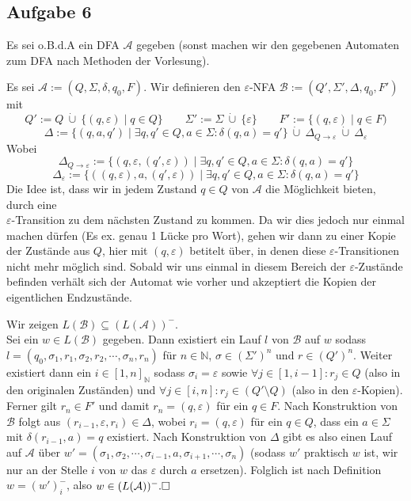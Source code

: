 \documentclass[a4paper,graphics,11pt]{article}
\newcommand{\aufgabe}[1]{\subsection*{Aufgabe #1}}
\begin{document}
\newpage
\aufgabe{6}
Es sei o.B.d.A ein DFA $\mathcal{A}$ gegeben (sonst machen wir den gegebenen Automaten zum DFA nach Methoden
der Vorlesung).

Es sei $\mathcal{A} := (Q, \Sigma, \delta, q_0, F)$.
Wir definieren den $\varepsilon$-NFA $\mathcal{B} := (Q', \Sigma', \Delta, q_0, F')$ mit
$$
    Q' := Q\ \dot\cup\ \{(q, \varepsilon) \mid q \in Q\}
    \qquad \Sigma' := \Sigma\ \dot\cup\ \{\varepsilon\}
    \qquad F' := \{(q, \varepsilon) \mid q \in F)
$$$$
    \Delta := \{(q, a, q') \mid \exists q,q' \in Q, a \in \Sigma : \delta(q, a) = q'\}\ \dot\cup\ \Delta_{Q \to \varepsilon}\ \dot\cup\ \Delta_\varepsilon
$$
Wobei
$$
    \Delta_{Q \to \varepsilon} := \{(q, \varepsilon, (q', \varepsilon)) \mid \exists q,q' \in Q, a \in \Sigma : \delta(q, a) = q'\}
$$$$
    \Delta_\varepsilon := \{((q, \varepsilon), a, (q', \varepsilon)) \mid \exists q,q' \in Q, a \in \Sigma : \delta(q, a) = q'\}
$$
Die Idee ist, dass wir in jedem Zustand $q \in Q$ von $\mathcal{A}$ die Möglichkeit bieten, durch eine\\
$\varepsilon$-Transition zu dem nächsten Zustand zu kommen. Da wir dies jedoch nur einmal machen dürfen
(Es ex. genau 1 Lücke pro Wort), gehen wir dann zu einer Kopie der Zustände aus $Q$, hier mit $(q, \varepsilon)$
betitelt über, in denen diese $\varepsilon$-Transitionen nicht mehr möglich sind. Sobald wir uns einmal in diesem
Bereich der $\varepsilon$-Zustände befinden verhält sich der Automat wie vorher und akzeptiert die Kopien der
eigentlichen Endzustände.

Wir zeigen $L(\mathcal{B}) \subseteq (L(\mathcal{A}))^-$.\\[2pt]
Sei ein $w \in L(\mathcal{B})$ gegeben. Dann existiert ein Lauf $l$ von $\mathcal{B}$ auf
$w$ sodass $l = (q_0, \sigma_1, r_1, \sigma_2, r_2, \cdots, \sigma_n, r_n)$ für $n \in \mathbb{N}$, $\sigma \in (\Sigma')^n$ und $r \in (Q')^n$.
Weiter existiert dann ein $i \in [1, n]_\mathbb{N}$ sodass $\sigma_i = \varepsilon$ sowie
$\forall j \in [1, i-1] : r_j \in Q$ (also in den originalen Zuständen) und
$\forall j \in [i, n] : r_j \in (Q'\setminus Q)$ (also in den $\varepsilon$-Kopien).
Ferner gilt $r_n \in F'$ und damit $r_n = (q, \varepsilon)$ für ein $q \in F$.
Nach Konstruktion von $\mathcal{B}$ folgt aus $(r_{i-1}, \varepsilon, r_i) \in \Delta$,
wobei $r_i = (q, \varepsilon)$ für ein $q \in Q$, dass ein $a \in \Sigma$ mit
$\delta(r_{i-1}, a) = q$ existiert. Nach Konstruktion von $\Delta$ gibt es also einen Lauf auf $\mathcal{A}$ über
$w' = (\sigma_1, \sigma_2, \cdots, \sigma_{i-1}, a, \sigma_{i+1}, \cdots, \sigma_n)$ (sodass $w'$ praktisch
$w$ ist, wir nur an der Stelle $i$ von $w$ das $\varepsilon$ durch $a$ ersetzen). Folglich ist nach Definition
$w = (w')_i^-$, also $w \in (L(\mathcal{A}))^-. \hfill\square$
\end{document}
